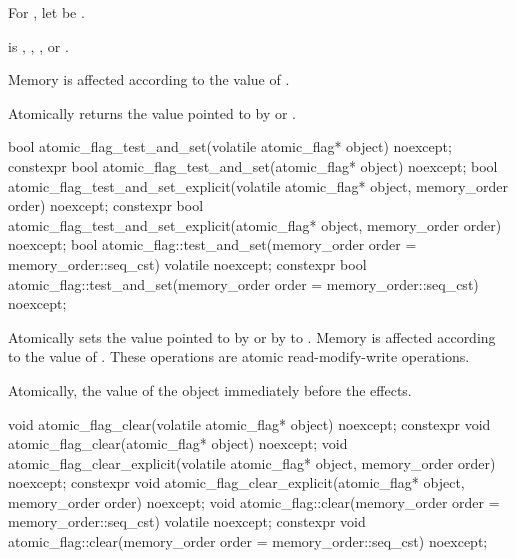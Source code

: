 \begin{itemdescr}
\pnum
For , let  be .

\pnum
\expects
{} is
,
,
, or
.

\pnum
\effects
Memory is affected according to the value of .

\pnum
\returns
Atomically returns the value pointed to by  or .
\end{itemdescr}

%
%
%
\begin{itemdecl}
bool atomic_flag_test_and_set(volatile atomic_flag* object) noexcept;
constexpr bool atomic_flag_test_and_set(atomic_flag* object) noexcept;
bool atomic_flag_test_and_set_explicit(volatile atomic_flag* object, memory_order order) noexcept;
constexpr bool atomic_flag_test_and_set_explicit(atomic_flag* object, memory_order order) noexcept;
bool atomic_flag::test_and_set(memory_order order = memory_order::seq_cst) volatile noexcept;
constexpr bool atomic_flag::test_and_set(memory_order order = memory_order::seq_cst) noexcept;
\end{itemdecl}

\begin{itemdescr}
\pnum
\effects
Atomically sets the value pointed to by  or by  to . Memory is affected according to the value of
. These operations are atomic read-modify-write operations.

\pnum
\returns
Atomically, the value of the object immediately before the effects.
\end{itemdescr}

%
%
%
\begin{itemdecl}
void atomic_flag_clear(volatile atomic_flag* object) noexcept;
constexpr void atomic_flag_clear(atomic_flag* object) noexcept;
void atomic_flag_clear_explicit(volatile atomic_flag* object, memory_order order) noexcept;
constexpr void atomic_flag_clear_explicit(atomic_flag* object, memory_order order) noexcept;
void atomic_flag::clear(memory_order order = memory_order::seq_cst) volatile noexcept;
constexpr void atomic_flag::clear(memory_order order = memory_order::seq_cst) noexcept;
\end{itemdecl}

